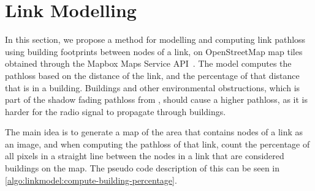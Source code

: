 \section{Link Modelling}\label{sec:linkmodel}
In this section, we propose a method for modelling and computing link \gls{pathloss} using building footprints
between nodes of a link, on OpenStreetMap map tiles obtained through the Mapbox Maps Service
API~\cite{website:mapbox}. The model computes the \gls{pathloss} based on the distance of the link, and the
percentage of that distance that is in a building. Buildings and other environmental obstructions, which is
part of the shadow fading \gls{pathloss} from \cite{paper:linkmodel}, should cause a higher \gls{pathloss}, as
it is harder for the radio signal to propagate through buildings. \medbreak

The main idea is to generate a map of the area that contains nodes of a link as an image, and when computing
the \gls{pathloss} of that link, count the percentage of all pixels in a straight line between the nodes in a
link that are considered buildings on the map. The pseudo code description of this can be seen in
\autoref{algo:linkmodel:compute-building-percentage}.




